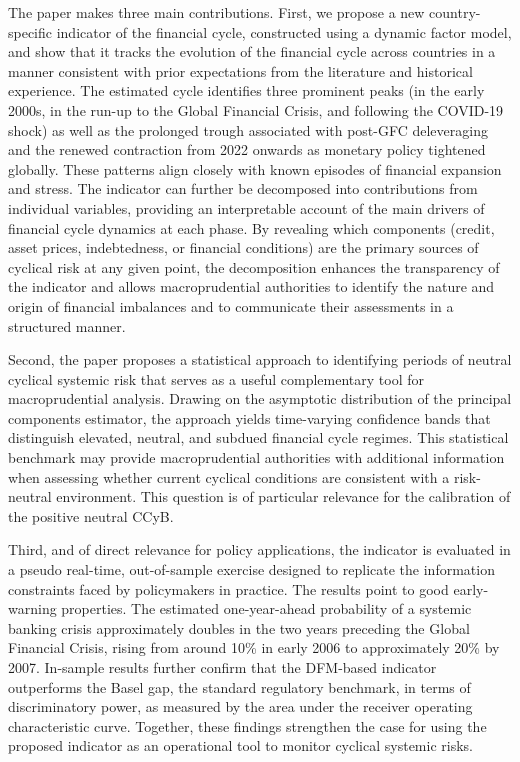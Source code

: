 The paper makes three main contributions. First, we propose a new country-specific indicator of the financial cycle, constructed using a dynamic factor model, and show that it tracks the evolution of the financial cycle across countries in a manner consistent with prior expectations from the literature and historical experience. The estimated cycle identifies three prominent peaks (in the early 2000s, in the run-up to the Global Financial Crisis, and following the COVID-19 shock) as well as the prolonged trough associated with post-GFC deleveraging and the renewed contraction from 2022 onwards as monetary policy tightened globally. These patterns align closely with known episodes of financial expansion and stress. The indicator can further be decomposed into contributions from individual variables, providing an interpretable account of the main drivers of financial cycle dynamics at each phase. By revealing which components (credit, asset prices, indebtedness, or financial conditions) are the primary sources of cyclical risk at any given point, the decomposition enhances the transparency of the indicator and allows macroprudential authorities to identify the nature and origin of financial imbalances and to communicate their assessments in a structured manner.

Second, the paper proposes a statistical approach to identifying periods of neutral cyclical systemic risk that serves as a useful complementary tool for macroprudential analysis. Drawing on the asymptotic distribution of the principal components estimator, the approach yields time-varying confidence bands that distinguish elevated, neutral, and subdued financial cycle regimes. This statistical benchmark may provide macroprudential authorities with additional information when assessing whether current cyclical conditions are consistent with a risk-neutral environment. This question is of particular relevance for the calibration of the positive neutral CCyB.

Third, and of direct relevance for policy applications, the indicator is evaluated in a pseudo real-time, out-of-sample exercise designed to replicate the information constraints faced by policymakers in practice. The results point to good early-warning properties. The estimated one-year-ahead probability of a systemic banking crisis approximately doubles in the two years preceding the Global Financial Crisis, rising from around 10\% in early 2006 to approximately 20\% by 2007. In-sample results further confirm that the DFM-based indicator outperforms the Basel gap, the standard regulatory benchmark, in terms of discriminatory power, as measured by the area under the receiver operating characteristic curve. Together, these findings strengthen the case for using the proposed indicator as an operational tool to monitor cyclical systemic risks.

